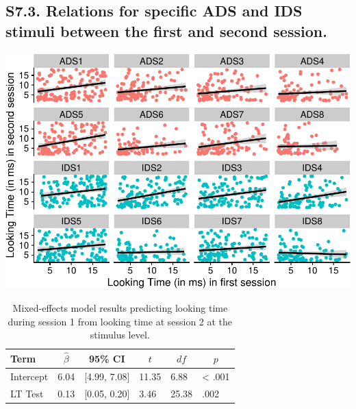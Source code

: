 \documentclass[
  man, donotrepeattitle,floatsintext]{apa6}
\begin{document}
\hypertarget{s7.3.-relations-for-specific-ads-and-ids-stimuli-between-the-first-and-second-session.}{%
\subsection{S7.3. Relations for specific ADS and IDS stimuli between the first and second session.}\label{s7.3.-relations-for-specific-ads-and-ids-stimuli-between-the-first-and-second-session.}}

\includegraphics{MB1T_supplement_files/figure-latex/unnamed-chunk-12-1.pdf}

\begin{table}[tbp]

\begin{center}
\begin{threeparttable}

\caption{\label{tab:unnamed-chunk-12}Mixed-effects model results predicting looking time during session 1 from looking time at session 2 at the stimulus level.}

\begin{tabular}{llllll}
\toprule
Term & \multicolumn{1}{c}{$\hat{\beta}$} & \multicolumn{1}{c}{95\% CI} & \multicolumn{1}{c}{$t$} & \multicolumn{1}{c}{$\mathit{df}$} & \multicolumn{1}{c}{$p$}\\
\midrule
Intercept & 6.04 & {}[4.99, 7.08] & 11.35 & 6.88 & < .001\\
LT Test & 0.13 & {}[0.05, 0.20] & 3.46 & 25.38 & .002\\
\bottomrule
\end{tabular}

\end{threeparttable}
\end{center}

\end{table}
\end{document}
